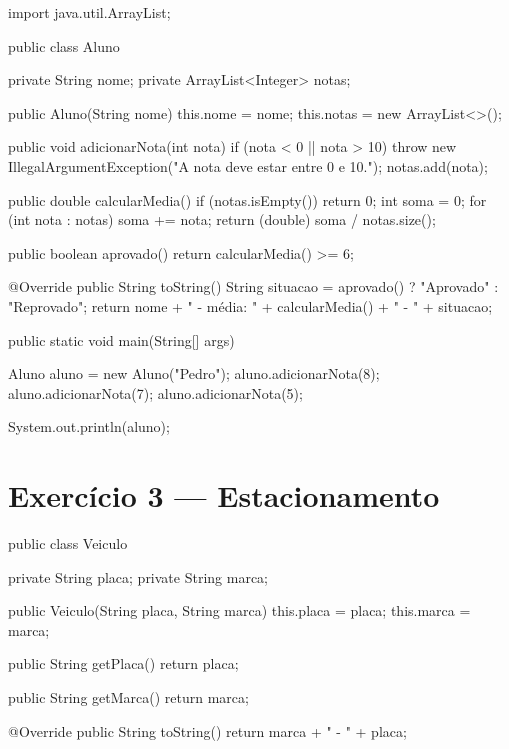 \documentclass[11pt,a4paper]{article}
\begin{document}
\begin{javacode}
import java.util.ArrayList;

public class Aluno {
    private String nome;
    private ArrayList<Integer> notas;

    public Aluno(String nome) {
        this.nome = nome;
        this.notas = new ArrayList<>();
    }

    public void adicionarNota(int nota) {
        if (nota < 0 || nota > 10) {
            throw new IllegalArgumentException("A nota deve estar entre 0 e 10.");
        }
        notas.add(nota);
    }

    public double calcularMedia() {
        if (notas.isEmpty()) {
            return 0;
        }
        int soma = 0;
        for (int nota : notas) {
            soma += nota;
        }
        return (double) soma / notas.size();
    }

    public boolean aprovado() {
        return calcularMedia() >= 6;
    }

    @Override
    public String toString() {
        String situacao = aprovado() ? "Aprovado" : "Reprovado";
        return nome + " - média: " + calcularMedia() + " - " + situacao;
    }

    public static void main(String[] args) {
        Aluno aluno = new Aluno("Pedro");
        aluno.adicionarNota(8);
        aluno.adicionarNota(7);
        aluno.adicionarNota(5);

        System.out.println(aluno);
    }
}
\end{javacode}

\section{Exercício 3 --- Estacionamento}

\begin{javacode}
public class Veiculo {
    private String placa;
    private String marca;

    public Veiculo(String placa, String marca) {
        this.placa = placa;
        this.marca = marca;
    }

    public String getPlaca() {
        return placa;
    }

    public String getMarca() {
        return marca;
    }

    @Override
    public String toString() {
        return marca + " - " + placa;
    }
}
\end{javacode}
\end{document}
